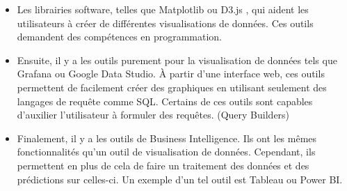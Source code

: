 \begin{itemize}
  \item Les librairies software, telles que Matplotlib ou D3.js , qui aident les utilisateurs à créer de différentes visualisations de données. Ces outils demandent des compétences en programmation.

  \item Ensuite, il y a les outils purement pour la visualisation de données tels que Grafana ou Google Data Studio. À partir d’une interface web, ces outils permettent de facilement créer des graphiques en utilisant seulement des langages de requête comme SQL. Certains de ces outils sont capables d’auxilier l’utilisateur à formuler des requêtes. (Query Builders)

  \item Finalement, il y a les outils de Business Intelligence. Ils ont les mêmes fonctionnalités qu’un outil de visualisation de données. Cependant, ils permettent en plus de cela de faire un traitement des données et des prédictions sur celles-ci. Un exemple d’un tel outil est Tableau ou Power BI.
\end{itemize}
